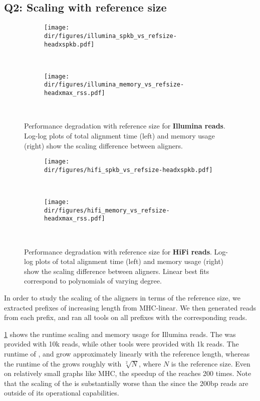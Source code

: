 \subsection{Q2: Scaling with reference size} \label{SEEDsec:eval-refsize}

\begin{figure}[t]
  \begin{subfigure}{.5\textwidth}
    \centering
    \texttt{[image: \\dir/figures/illumina\_spkb\_vs\_refsize-headxspkb.pdf]}
  \end{subfigure}~\hspace{1em}
  \begin{subfigure}{.5\textwidth}
    \centering
    \texttt{[image: \\dir/figures/illumina\_memory\_vs\_refsize-headxmax\_rss.pdf]}
  \end{subfigure}~\hspace{1em} \caption{Performance degradation with reference
  size for \textbf{Illumina reads}. Log-log plots of total alignment time (left)
  and memory usage (right) show the scaling difference between aligners.}
  \label{SEEDfig:illumina_scaling_with_genomesize}
\end{figure}

\begin{figure}[t]
  \begin{subfigure}{.5\textwidth}
    \centering
    \texttt{[image: \\dir/figures/hifi\_spkb\_vs\_refsize-headxspkb.pdf]}
  \end{subfigure}~\hspace{1em}
  \begin{subfigure}{.5\textwidth}
    \centering
    \texttt{[image: \\dir/figures/hifi\_memory\_vs\_refsize-headxmax\_rss.pdf]}
  \end{subfigure}~\hspace{1em} \caption{Performance degradation with reference
  size for \textbf{HiFi reads}. Log-log plots of total alignment time (left) and
  memory usage (right) show the scaling difference between aligners. Linear best
  fits correspond to polynomials of varying degree.}
  \label{SEEDfig:hifi_scaling_with_genomesize}
\end{figure}

In order to study the scaling of the aligners in terms of the reference size, we
extracted prefixes of increasing length from MHC-linear. We then generated reads
from each prefix, and ran all tools on all prefixes with the corresponding
reads.

\cref{SEEDfig:illumina_scaling_with_genomesize} shows the runtime scaling and memory
usage for Illumina reads. The \seedh was provided with 10k reads, while other
tools were provided with 1k reads.
%
The runtime of \graphaligner, \pasgal and \vargas grow approximately linearly
with the reference length, whereas the runtime of the \seedh grows roughly with
$\sqrt[2]{N}$, where $N$ is the reference size. Even on relatively small graphs
like MHC, the speedup of the \seedh reaches 200 times. Note that the scaling of
the \prefixh is substantially worse than the \seedh since the 200bp reads are
outside of its operational capabilities.

